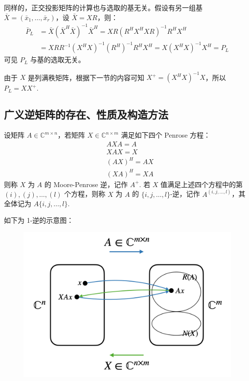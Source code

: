 \begin{com}
同样的，正交投影矩阵的计算也与选取的基无关。假设有另一组基 $\bar X=(\bar x_1,\ldots,\bar x_r)$，设 $\bar X=XR$，则：
\begin{align*}
    \bar P_L&=\bar X({\bar X}^H\bar X)^{-1}{\bar X}^H=XR(R^HX^HXR)^{-1}R^HX^H\\
    &=XRR^{-1}(X^HX)^{-1}(R^H)^{-1}R^HX^H=X(X^HX)^{-1}X^H=P_L
\end{align*}
可见 $P_L$ 与基的选取无关。
\end{com}

\begin{remark}
由于 $X$ 是列满秩矩阵，根据下一节的内容可知 $X^+=(X^HX)^{-1}X$，所以 $P_L=XX^+$.
\end{remark}


\subsection{广义逆矩阵的存在、性质及构造方法}

\begin{definition}
\label{def:moore-penrose}
设矩阵 $A\in\mathbb C^{m\times n}$，若矩阵 $X\in\mathbb C^{n\times m}$ 满足如下四个 Penrose 方程：
\begin{align*}
    &AXA=A\tag{1}\label{1}\\
    &XAX=X\tag{2}\label{2}\\
    &(AX)^H=AX\tag{3}\label{3}\\
    &(XA)^H=XA\tag{4}\label{4}
\end{align*}
则称 $X$ 为 $A$ 的 Moore-Penrose 逆，记作 $A^+$.
若 $X$ 值满足上述四个方程中的第 $(i),(j),\ldots,(l)$ 个方程，则称 $X$ 为 $A$ 的 $\{i,j,\ldots,l\}$-逆，记作 $A^{(i,j,\ldots,l)}$，其全体记为 $A\{i,j,\ldots,l\}$.

如下为 1-逆的示意图：
\begin{figure}[H]
    \centering
    \includegraphics[width=0.5\linewidth]{figs/1inv.png}
\end{figure}
\end{definition}

